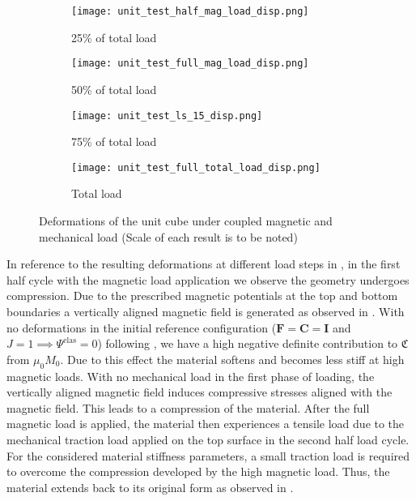 \begin{figure}[h]
\centering
\begin{subfigure}{0.23\textwidth}
\centering
\texttt{[image: unit\_test\_half\_mag\_load\_disp.png]}
\caption{25\% of total load}
\label{fig:3.9.1}
\end{subfigure}
\begin{subfigure}{0.24\textwidth}
\centering
\texttt{[image: unit\_test\_full\_mag\_load\_disp.png]}
\caption{50\% of total load}
\label{fig:3.9.2}
\end{subfigure}
\begin{subfigure}{0.24\textwidth}
\centering
\texttt{[image: unit\_test\_ls\_15\_disp.png]}
\caption{75\% of total load}
\label{fig:3.9.3}
\end{subfigure}
\begin{subfigure}{0.23\textwidth}
\centering
\texttt{[image: unit\_test\_full\_total\_load\_disp.png]}
\caption{Total load}
\label{fig:3.9.4}
\end{subfigure}
\caption{Deformations of the unit cube under coupled magnetic and mechanical load (Scale of each result is to be noted)}
\label{fig:3.9}
\end{figure}

In reference to the resulting deformations at different load steps in , in the first half cycle with the magnetic load application we observe the geometry undergoes compression. Due to the prescribed magnetic potentials at the top and bottom boundaries a vertically aligned magnetic field is generated as observed in . With no deformations in the initial reference configuration ($\mathbf{F} = \mathbf{C} = \mathbf{I}$ and $J = 1 \implies \Psi^{\text{elas}} = 0$) following , we have a high negative definite contribution to $\mathfrak{C}$ from $\mu_0 M_0$. Due to this effect the material softens and becomes less stiff at high magnetic loads. With no mechanical load in the first phase of loading, the vertically aligned magnetic field induces compressive stresses aligned with the magnetic field. This leads to a compression of the material. After the full magnetic load is applied, the material then experiences a tensile load due to the mechanical traction load applied on the top surface in the second half load cycle. For the considered material stiffness parameters, a small traction load is required to overcome the compression developed by the high magnetic load. Thus, the material extends back to its original form as observed in . \par 

